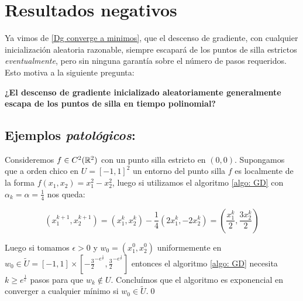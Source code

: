 \chapter{Resultados negativos}\label{ch:resultadosNegativos}

Ya vimos de \ref{Dg converge a minimos}, que el descenso de gradiente, con cualquier inicialización aleatoria razonable, siempre escapará de los puntos de silla estrictos \textit{eventualmente}, pero sin ninguna garantía sobre el número de pasos requeridos. Esto motiva a la siguiente
pregunta:

\textbf{¿El descenso de gradiente inicializado aleatoriamente generalmente escapa de los puntos de silla en tiempo polinomial?}

\section{Ejemplos \textit{patol\'ogicos}:}

\begin{example}
	Consideremos $f \in C^2({\mathbb{R}}^2)$ con un punto silla estricto en $(0,0)$. Supongamos que a orden chico en $U = [-1,1]^2$ un entorno del punto silla $f$ es localmente de la forma $f(x_1, x_2) = x_1^2 - x_2^2$, luego si utilizamos el algoritmo \ref{algo: GD} con $\alpha_k = \alpha = \frac{1}{4}$ nos queda:
	
	\begin{equation*}
		\left(x_1^{k+1}, x^{k+1}_2\right) = \left(x^k_1, x^k_2\right)- \frac{1}{4} \left(2x^k_1, -2x^k_2\right) = \left(\frac{x^k_1}{2}, \frac{3 x^k_2}{2}\right)
	\end{equation*}
	
	Luego si tomamos $\epsilon >0$ y $w_0 = (x_1^0, x_2^0)$ uniformemente en $w_0\in \widetilde{U} = [-1,1] \times \left[- \frac{3}{2}^{-e^{\frac{1}{\epsilon}}}, \frac{3}{2}^{-e^{\frac{1}{\epsilon}}}\right]$ entonces el algoritmo \ref{algo: GD} necesita $k \geq e^{\frac{1}{\epsilon}}$ pasos para que $w_k \not \in U$. Conclu\'imos que el algoritmo es exponencial en converger a cualquier m\'inimo si $w_0 \in \widetilde{U}$.\qed 
	
\end{example}

